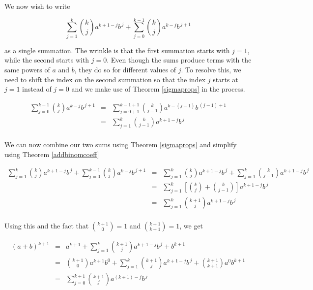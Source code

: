 \documentclass{ximera}
\begin{document}
We now wish to write

\[\displaystyle{\sum_{j=1}^{k} \binom{k}{j} a^{k+1-j} b^{\, j} + \sum_{j=0}^{k-1} \binom{k}{j} a^{k-j} b^{\, j+1}}\]

as a single summation.  The wrinkle is that the first summation starts with $j=1$, while the second starts with $j=0$. Even though the sums produce terms with the same powers of $a$ and $b$, they do so for different values of $j$.  To resolve this, we need to shift the index on the second summation so that the index $j$ starts at $j=1$ instead of $j=0$ and we make use of Theorem \ref{sigmaprops} in the process.

\[ \begin{array}{rcl}

\displaystyle{ \sum_{j=0}^{k-1} \binom{k}{j} a^{k-j} b^{\, j+1}} & = & \displaystyle{\sum_{j=0+1}^{k-1+1} \binom{k}{j-1} a^{k-(j-1)} b^{\, (j-1)+1}} \\ 
                                                              & = & \displaystyle{\sum_{j=1}^{k} \binom{k}{j-1} a^{k+1-j} b^{\, j}} \\   
\end{array} \]

We can now combine our two sums using Theorem \ref{sigmaprops} and simplify using Theorem \ref{addbinomcoeff}

\[ \begin{array}{rcl}

\displaystyle{\sum_{j=1}^{k} \binom{k}{j} a^{k+1-j} b^{\, j} + \sum_{j=0}^{k-1} \binom{k}{j} a^{k-j} b^{\, j+1}} & = & \displaystyle{\sum_{j=1}^{k} \binom{k}{j} a^{k+1-j} b^{\, j} + \sum_{j=1}^{k} \binom{k}{j-1} a^{k+1-j} b^{\, j}} \\   

& = & \displaystyle{\sum_{j=1}^{k} \left[ \binom{k}{j} + \binom{k}{j-1} \right] a^{k+1-j} b^{\, j} } \\  

& = & \displaystyle{\sum_{j=1}^{k} \binom{k+1}{j} a^{k+1-j} b^{\, j} } \\

\end{array} \]

Using this and the fact that $\binom{k+1}{0} = 1$ and $\binom{k+1}{k+1} = 1$, we get

\[ \begin{array}{rcl}

(a+b)^{k+1} & = & a^{k+1} + \displaystyle{\sum_{j=1}^{k} \binom{k+1}{j} a^{k+1-j} b^{\, j} } + b^{k+1} \\  
            & = & \displaystyle{ \binom{k+1}{0} a^{k+1} b^{0} + \sum_{j=1}^{k} \binom{k+1}{j} a^{k+1-j} b^{\, j}  + \binom{k+1}{k+1} a^{0} b^{k+1}} \\  
            & = & \displaystyle{  \sum_{j=0}^{k+1} \binom{k+1}{j} a^{(k+1)-j} b^{\, j}} \\  
 \end{array}\]
 
\end{document}
